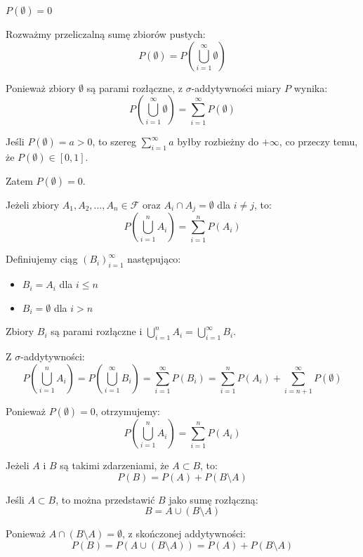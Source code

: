\documentclass[final,a4paper,openany,12pt]{mwbk}
\begin{document}
\begin{Tw}
$P(\emptyset) = 0$
\end{Tw}

\begin{Dow}
Rozważmy przeliczalną sumę zbiorów pustych:
$$P(\emptyset) = P\left(\bigcup_{i=1}^{\infty} \emptyset\right)$$

Ponieważ zbiory $\emptyset$ są parami rozłączne, z $\sigma$-addytywności miary $P$ wynika:
$$P\left(\bigcup_{i=1}^{\infty} \emptyset\right) = \sum_{i=1}^{\infty} P(\emptyset)$$

Jeśli $P(\emptyset) = a > 0$, to szereg $\sum_{i=1}^{\infty} a$ byłby rozbieżny do $+\infty$, co przeczy temu, że $P(\emptyset) \in [0,1]$.

Zatem $P(\emptyset) = 0$.
\end{Dow}

\begin{Tw}
Jeżeli zbiory $A_1, A_2, \ldots, A_n \in \mathcal{F}$ oraz $A_i \cap A_j = \emptyset$ dla $i \neq j$, to:
$$P\left(\bigcup_{i=1}^{n} A_i\right) = \sum_{i=1}^{n} P(A_i)$$
\end{Tw}

\begin{Dow}
Definiujemy ciąg $(B_i)_{i=1}^{\infty}$ następująco:
\begin{itemize}
    \item $B_i = A_i$ dla $i \leq n$
    \item $B_i = \emptyset$ dla $i > n$
\end{itemize}

Zbiory $B_i$ są parami rozłączne i $\displaystyle\bigcup_{i=1}^{n} A_i = \bigcup_{i=1}^{\infty} B_i$.

Z $\sigma$-addytywności:
$$P\left(\bigcup_{i=1}^{n} A_i\right) = P\left(\bigcup_{i=1}^{\infty} B_i\right) = \sum_{i=1}^{\infty} P(B_i) = \sum_{i=1}^{n} P(A_i) + \sum_{i=n+1}^{\infty} P(\emptyset)$$

Ponieważ $P(\emptyset) = 0$, otrzymujemy:
$$P\left(\bigcup_{i=1}^{n} A_i\right) = \sum_{i=1}^{n} P(A_i)$$
\end{Dow}

\begin{Tw}
Jeżeli $A$ i $B$ są takimi zdarzeniami, że $A \subset B$, to:
$$P(B) = P(A) + P(B \setminus A)$$
\end{Tw}

\begin{Dow}
Jeśli $A \subset B$, to można przedstawić $B$ jako sumę rozłączną:
$$B = A \cup (B \setminus A)$$

Ponieważ $A \cap (B \setminus A) = \emptyset$, z skończonej addytywności:
$$P(B) = P(A \cup (B \setminus A)) = P(A) + P(B \setminus A)$$
\end{Dow}
\end{document}
